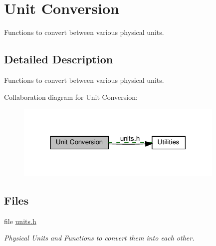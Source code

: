 \hypertarget{group__units}{}\section{Unit Conversion}
\label{group__units}


Functions to convert between various physical units.  




\subsection{Detailed Description}
Functions to convert between various physical units. 

Collaboration diagram for Unit Conversion\+:
\nopagebreak
\begin{figure}[H]
\begin{center}
\leavevmode
\includegraphics[width=283pt]{group__units}
\end{center}
\end{figure}
\subsection*{Files}
\begin{DoxyCompactItemize}
\item 
file \hyperlink{units_8h}{units.\+h}
\begin{DoxyCompactList}\small\item\em Physical Units and Functions to convert them into each other. \end{DoxyCompactList}\end{DoxyCompactItemize}
